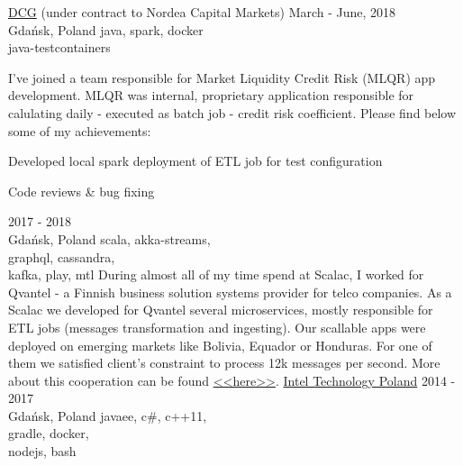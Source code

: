 \documentclass[a4paper,11pt]{cv4tw}%
\begin{document}
      {\href{https://diversecg.pl/}{DCG} (under contract to Nordea Capital Markets)}
      {March - June, 2018\\Gdańsk, Poland}
      {java, spark, docker\\java-testcontainers}
      {I've joined a team responsible for Market Liquidity Credit Risk (MLQR) app development.
        MLQR was internal, proprietary application responsible for calulating daily - executed as batch job - credit risk coefficient.
        Please find below some of my achievements:
        \begin{missions}
        \item Developed local spark deployment of ETL job for test configuration
        \item Code reviews \& bug fixing
        \end{missions}
      }
      {2017 - 2018\\Gdańsk, Poland}
      {scala, akka-streams,\\graphql, cassandra,\\kafka, play, mtl}
      {During almost all of my time spend at Scalac, I worked for Qvantel - a Finnish business solution systems provider for telco companies.
        As a Scalac we developed for Qvantel several microservices, mostly responsible for ETL jobs (messages transformation and ingesting).
        Our scallable apps were deployed on emerging markets like Bolivia, Equador or Honduras. For one of them we satisfied client's constraint
        to process \approx12k messages per second. More about this cooperation can be found
        \href{http://media.licdn.com/embeds/media.html?src=https\%3A\%2F\%2Fissuu.com\%2Foutlookpublishing\%2Fdocs\%2Fqvantel\&amp;url=https\%3A\%2F\%2Fissuu.com\%2Foutlookpublishing\%2Fdocs\%2Fqvantel\&amp;type=text\%2Fhtml\&amp;schema=issuu}{<<here>>}.
      }
      {\href{https://www.intel.com/content/www/us/en/jobs/locations/poland.html}
        {Intel Technology Poland}}
      {2014 - 2017\\Gdańsk, Poland}
      {javaee, c\#, c++11,\\gradle, docker,\\nodejs, bash}
\end{document}

